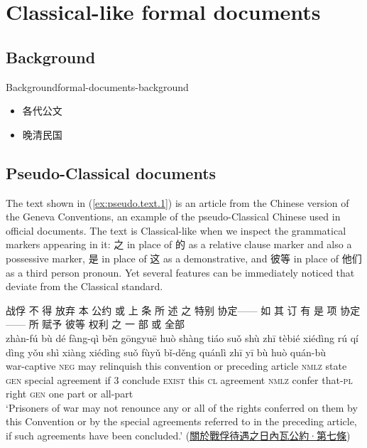 \documentclass[UTF8, a4paper, oneside, scheme=plain, 12pt]{ctexrep}
\newcommand{\translate}[1]{`#1'}
\newcommand*{\category}[1]{\textsc{#1}}
\begin{document}
\section{Classical-like formal documents}

\subsection{Background}

\begin{todobox}{Background}{formal-documents-background}
    \begin{itemize}
        \item 各代公文
        \item 晚清民国
    \end{itemize}
\end{todobox}

\subsection{Pseudo-Classical documents}\label{sec:genres.pseudo}

The text shown in (\ref{ex:pseudo.text.1}) is an article from the Chinese version of the Geneva Conventions, an example of the pseudo-Classical Chinese used in official documents.
The text is Classical-like when we inspect the grammatical markers appearing in it:
之 in place of 的 as a relative clause marker and also a possessive marker,
是 in place of 这 as a demonstrative,
and 彼等 in place of 他们 as a third person pronoun.
Yet several features can be immediately noticed that deviate from the Classical standard.

\begin{exe}
    \ex\label{ex:pseudo.text.1}
    \glll 战俘 不 得 放弃 本 公约 或 上 条 所 述 之 特别 协定—— 如 其 订 有 是 项 协定—— 所 赋予 彼等 权利 之 一 部 或 全部 \\
    zhàn-fú bù dé fàng-qì běn gōngyuē huò shàng tiáo suǒ shù zhī tèbié xiédìng rú qí dìng yǒu shì xiàng xiédìng suǒ fùyǔ bǐ-děng quánlì zhī yī bù huò quán-bù \\
    war-captive \category{neg} may relinquish this convention or preceding article \category{nmlz} state \category{gen} special agreement if 3 conclude \category{exist} this \category{cl} agreement \category{nmlz} confer that-\category{pl} right \category{gen} one part or all-part \\
    \glt\translate{Prisoners of war may not renounce any or all of the rights conferred on them by this Convention or by the special agreements referred to in the preceding article, if such agreements have been concluded.} \hfill (\href{https://www.un.org/zh/node/182215}{關於戰俘待遇之日內瓦公約·第七條})
\end{exe}
\end{document}
